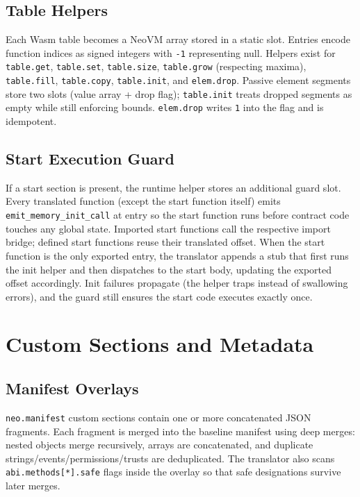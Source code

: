 \documentclass[11pt]{article}
\begin{document}
\subsection{Table Helpers}
Each Wasm table becomes a NeoVM array stored in a static slot. Entries encode function indices as signed integers with \texttt{-1} representing null. Helpers exist for \texttt{table.get}, \texttt{table.set}, \texttt{table.size}, \texttt{table.grow} (respecting maxima), \texttt{table.fill}, \texttt{table.copy}, \texttt{table.init}, and \texttt{elem.drop}. Passive element segments store two slots (value array + drop flag); \texttt{table.init} treats dropped segments as empty while still enforcing bounds. \texttt{elem.drop} writes \texttt{1} into the flag and is idempotent.

\subsection{Start Execution Guard}
If a start section is present, the runtime helper stores an additional guard slot. Every translated function (except the start function itself) emits \texttt{emit\_memory\_init\_call} at entry so the start function runs before contract code touches any global state. Imported start functions call the respective import bridge; defined start functions reuse their translated offset. When the start function is the only exported entry, the translator appends a stub that first runs the init helper and then dispatches to the start body, updating the exported offset accordingly. Init failures propagate (the helper traps instead of swallowing errors), and the guard still ensures the start code executes exactly once.

\section{Custom Sections and Metadata}
\subsection{Manifest Overlays}
\texttt{neo.manifest} custom sections contain one or more concatenated JSON fragments. Each fragment is merged into the baseline manifest using deep merges: nested objects merge recursively, arrays are concatenated, and duplicate strings/events/permissions/trusts are deduplicated. The translator also scans \texttt{abi.methods[*].safe} flags inside the overlay so that safe designations survive later merges.
\end{document}
